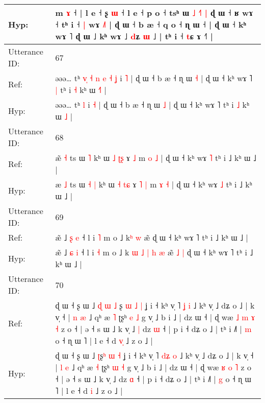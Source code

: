 \documentclass[10pt]{article}
\DeclareRobustCommand{\hl}[1]{{\textcolor{red}{#1}}}
\begin{document}
\begin{longtable}{ll}
Hyp: & m \hl{ɤ} ˧\hl{} | l e ˧ ʂ \hl{ɯ} ˧ l e ˧ p o ˧ tsʰ ɯ\hl{}\hl{} \hl{˩} \hl{˧}\hl{˥} \hl{|} ɖ ɯ ˧ ʁ wɤ ˧ tʰ i ˧ \hl{|} wɤ \hl{˩}\hl{˥} | ɖ ɯ ˧ b æ ˧ q o ˧ ɳ ɯ ˧ | ɖ ɯ ˧ kʰ wɤ ˥ ɖ ɯ ˩ kʰ wɤ ˩ \hl{d}ʑ \hl{ɯ} ˩ | tʰ i ˧ \hl{t}ɕ \hl{}ɤ ˧˥ |
 \\
\midrule
Utterance ID: & 67 \\
Ref: & əəə… tʰ\hl{ }\hl{v}\hl{̩}\hl{ }\hl{˧}\hl{ }\hl{n}\hl{ }\hl{e}\hl{ }\hl{˧} \hl{ʝ} i \hl{˥} | ɖ ɯ ˧ b æ ˧ ɳ ɯ \hl{˧} | ɖ ɯ ˧ kʰ wɤ ˥\hl{ }\hl{|} tʰ i \hl{˧} kʰ ɯ \hl{˧}\hl{˥} |
 \\
Hyp: & əəə… tʰ\hl{}\hl{}\hl{}\hl{}\hl{}\hl{}\hl{}\hl{}\hl{}\hl{}\hl{} \hl{l} i \hl{˧} | ɖ ɯ ˧ b æ ˧ ɳ ɯ \hl{˩} | ɖ ɯ ˧ kʰ wɤ ˥\hl{}\hl{} tʰ i \hl{˩} kʰ ɯ \hl{}\hl{˩} |
 \\
\midrule
Utterance ID: & 68 \\
Ref: & æ\hl{̃} \hl{˧} ts ɯ\hl{}\hl{} \hl{˥} kʰ ɯ \hl{˩} \hl{ʈ}\hl{ʂ} ɤ\hl{}\hl{} \hl{˩} m \hl{o} \hl{˩} | ɖ ɯ ˧ kʰ wɤ \hl{˥} tʰ i ˩ kʰ ɯ ˩ |
 \\
Hyp: & æ\hl{} \hl{˩} ts ɯ\hl{ }\hl{˧} \hl{|} kʰ ɯ \hl{˧} \hl{t}\hl{ɕ} ɤ\hl{ }\hl{˥} \hl{|} m \hl{ɤ} \hl{˧} | ɖ ɯ ˧ kʰ wɤ \hl{˩} tʰ i ˩ kʰ ɯ ˩ |
 \\
\midrule
Utterance ID: & 69 \\
Ref: & æ̃ ˩ \hl{ʂ} \hl{e} ˧ l i \hl{˥} m o ˩ k\hl{}\hl{}\hl{}\hl{}\hl{}\hl{}\hl{}\hl{ʰ} \hl{w} æ̃\hl{}\hl{}\hl{}\hl{} ɖ ɯ ˧ kʰ wɤ ˥ tʰ i ˩ kʰ ɯ ˩ |
 \\
Hyp: & æ̃ ˩ \hl{ɕ} \hl{i} ˧ l i \hl{˧} m o ˩ k\hl{ }\hl{ɯ}\hl{ }\hl{˩}\hl{ }\hl{|}\hl{ }\hl{h} \hl{æ} æ̃\hl{ }\hl{˩}\hl{ }\hl{|} ɖ ɯ ˧ kʰ wɤ ˥ tʰ i ˩ kʰ ɯ ˩ |
 \\
\midrule
Utterance ID: & 70 \\
Ref: & ɖ ɯ ˧ ʂ ɯ ˩\hl{ }\hl{ɖ}\hl{ }\hl{ɯ} \hl{˩}\hl{ }ʂ\hl{ }\hl{ɯ} \hl{˩} \hl{|} ʝ i ˧ kʰ v̩ ˥ \hl{}\hl{ʝ} \hl{i} ˩ kʰ v̩ ˩ dʑ o ˩ | k v̩ ˧ | \hl{n} \hl{æ} ˩ qʰ æ \hl{˥} ʈʂʰ \hl{e} \hl{˩} g v̩ ˩ b i ˩ | dz ɯ ˧ | ɖ wæ\hl{ }\hl{˩} \hl{m} \hl{ɤ} \hl{˧} z o ˧ | ə ˧ s ɯ ˩ k v̩ ˩\hl{ }\hl{|} dz \hl{ɯ} ˧ | p i ˧ dʑ o ˩ | tʰ i ˩˥ | \hl{m} o ˧ ɳ ɯ ˥ | l e ˧ d \hl{v}\hl{̩} ˩ z o ˩ |
 \\
Hyp: & ɖ ɯ ˧ ʂ ɯ ˩\hl{}\hl{}\hl{}\hl{} \hl{}\hl{ʈ}ʂ\hl{}\hl{ʰ} \hl{ɯ} \hl{˧} ʝ i ˧ kʰ v̩ ˥ \hl{d}\hl{ʑ} \hl{o} ˩ kʰ v̩ ˩ dʑ o ˩ | k v̩ ˧ | \hl{l} \hl{e} ˩ qʰ æ \hl{˧} ʈʂʰ \hl{ɯ} \hl{˧} g v̩ ˩ b i ˩ | dz ɯ ˧ | ɖ wæ\hl{}\hl{} \hl{ʁ} \hl{o} \hl{˥} z o ˧ | ə ˧ s ɯ ˩ k v̩ ˩\hl{}\hl{} dz \hl{ɑ} ˧ | p i ˧ dʑ o ˩ | tʰ i ˩˥ | \hl{g} o ˧ ɳ ɯ ˥ | l e ˧ d \hl{}\hl{i} ˩ z o ˩ |
 \\

\end{longtable}
\end{document}
